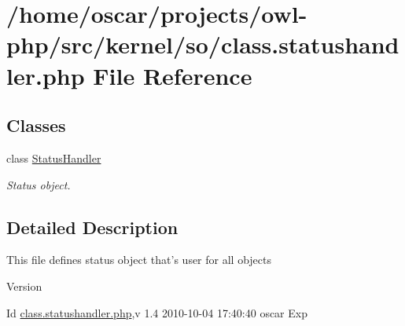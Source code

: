 \section{/home/oscar/projects/owl-\/php/src/kernel/so/class.statushandler.php File Reference}
\label{class_8statushandler_8php}
\subsection*{Classes}
\begin{DoxyCompactItemize}
\item 
class \hyperlink{classStatusHandler}{StatusHandler}
\begin{DoxyCompactList}\small\item\em Status object. \item\end{DoxyCompactList}\end{DoxyCompactItemize}


\subsection{Detailed Description}
This file defines status object that's user for all objects \begin{DoxyVersion}{Version}

\end{DoxyVersion}
\begin{DoxyParagraph}{Id}
\hyperlink{class_8statushandler_8php}{class.statushandler.php},v 1.4 2010-\/10-\/04 17:40:40 oscar Exp 
\end{DoxyParagraph}
